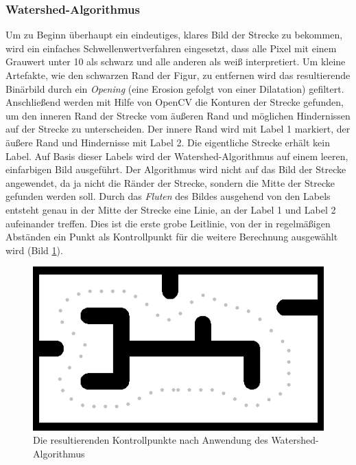 \documentclass[11pt,final,journal,a4paper,towside,towcolumn]{IEEEtran}
\begin{document}
\subsubsection{Watershed-Algorithmus}
Um zu Beginn überhaupt ein eindeutiges, klares Bild der Strecke zu bekommen, wird ein einfaches Schwellenwertverfahren eingesetzt, dass alle Pixel mit einem Grauwert unter 10 als schwarz und alle anderen als weiß interpretiert. Um kleine Artefakte, wie den schwarzen Rand der Figur, zu entfernen wird das resultierende Binärbild durch ein \emph{Opening} (eine Erosion gefolgt von einer Dilatation) gefiltert.
Anschließend werden mit Hilfe von OpenCV \cite{opencv} die Konturen der Strecke gefunden, um den inneren Rand der Strecke vom äußeren Rand und möglichen Hindernissen auf der Strecke zu unterscheiden. Der innere Rand wird mit Label 1 markiert, der äußere Rand und Hindernisse mit Label 2. Die eigentliche Strecke erhält kein Label. Auf Basis dieser Labels wird der Watershed-Algorithmus auf einem leeren, einfarbigen Bild ausgeführt. Der Algorithmus wird nicht auf das Bild der Strecke angewendet, da ja nicht die Ränder der Strecke, sondern die Mitte der Strecke gefunden werden soll. Durch das \emph{Fluten} des Bildes ausgehend von den Labels entsteht genau in der Mitte der Strecke eine Linie, an der Label 1 und Label 2 aufeinander treffen. Dies ist die erste grobe Leitlinie, von der in regelmäßigen Abständen ein Punkt als Kontrollpunkt für die weitere Berechnung ausgewählt wird (Bild \ref{fig-watershed}).
\begin{figure}
	\centering
	\includegraphics[width=\columnwidth]{watershed_result.png}
	\caption[Watershed-Ergebnis]{Die resultierenden Kontrollpunkte nach Anwendung des Watershed-Algorithmus}
	\label{fig-watershed}
\end{figure}
\end{document}
